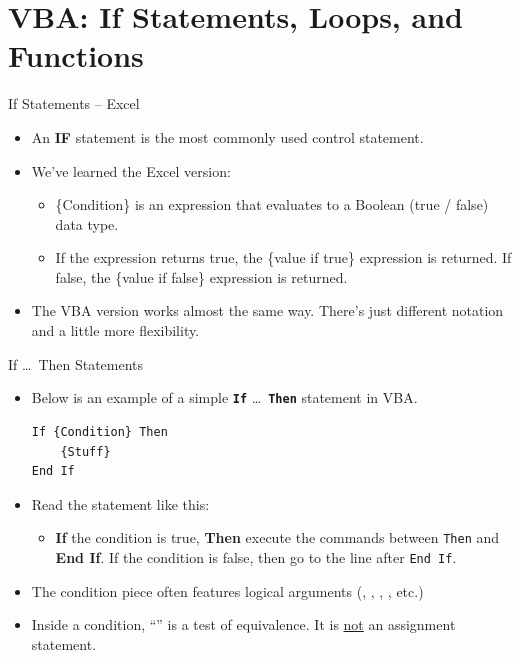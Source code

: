 \documentclass{beamer}
\newcommand{\kw}[1]{\textbf{\texttt{\color{blue!70!black}#1}}}
\begin{document}
\section{VBA: If Statements, Loops, and Functions}

\sectionframe

\begin{frame}{If Statements -- Excel}
\begin{itemize}
  \item An \textbf{IF} statement is the most commonly used control statement.
  \vspace{0.5em}
  \item We've learned the Excel version:
  \begin{center}\small
  \end{center}
  \begin{itemize}
    \item \{Condition\} is an expression that evaluates to a Boolean (true / false) data type.
    \item If the expression returns true, the \{value if true\} expression is returned.
          If false, the \{value if false\} expression is returned.
  \end{itemize}
  \vspace{0.5em}
  \item The VBA version works almost the same way. There's just different notation
        and a little more flexibility.
\end{itemize}
\end{frame}

\begin{frame}[fragile]{If \ldots\ Then Statements}
\begin{itemize}
  \item Below is an example of a simple \kw{If} \ldots\ \kw{Then} statement in VBA.
\begin{lstlisting}[language=VBA]
If {Condition} Then
    {Stuff}
End If
\end{lstlisting}
  \item Read the statement like this:
  \begin{itemize}
    \item \textbf{If} the condition is true, \textbf{Then} execute the commands between
          \texttt{Then} and \textbf{End If}. If the condition is false, then go to the line after
          \texttt{End If}.
  \end{itemize}
  \item The condition piece often features logical arguments (, , \code{<}, \code{>}, etc.)
  \item Inside a condition, ``\code{=}'' is a test of equivalence. It is \underline{not} an assignment statement.
\end{itemize}
\end{frame}
\end{document}
